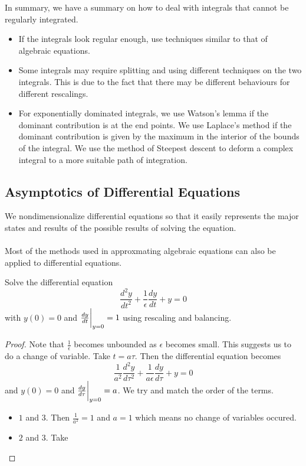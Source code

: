 \documentclass[a4paper]{article}
\begin{document}
In summary, we have a summary on how to deal with integrals that cannot be regularly integrated. 
\begin{itemize}
\item If the integrals look regular enough, use techniques similar to that of algebraic equations. 
\item Some integrals may require splitting and using different techniques on the two integrals. This is due to the fact that there may be different behaviours for different rescalings. 
\item For exponentially dominated integrals, we use Watson's lemma if the dominant contribution is at the end points. We use Laplace's method if the dominant contribution is given by the maximum in the interior of the bounds of the integral. We use the method of Steepest descent to deform a complex integral to a more suitable path of integration. 
\end{itemize}

\subsection{Asymptotics of Differential Equations}
We nondimensionalize differential equations so that it easily represents the major states and results of the possible results of solving the equation. \\~\\
Most of the methods used in approxmating algebraic equations can also be applied to differential equations. 

\begin{eg}{}{} Solve the differential equation $$\frac{d^2y}{dt^2}+\frac{1}{\epsilon}\frac{dy}{dt}+y=0$$ with $y(0)=0$ and $\frac{dy}{dt}\bigg{|}_{y=0}=1$ using rescaling and balancing. \tcbline
\begin{proof}
Note that $\frac{1}{\epsilon}$ becomes unbounded as $\epsilon$ becomes small. This suggests us to do a change of variable. Take $t=a\tau$. Then the differential equation becomes $$\frac{1}{a^2}\frac{d^2y}{d\tau^2}+\frac{1}{a\epsilon}\frac{dy}{d\tau}+y=0$$ and $y(0)=0$ and $\frac{dy}{d\tau}\bigg{|}_{y=0}=a$. We try and match the order of the terms. 
\begin{itemize}
\item $1$ and $3$. Then $\frac{1}{a^2}=1$ and $a=1$ which means no change of variables occured. 
\item $2$ and $3$. Take 
\end{itemize}
\end{proof}
\end{eg}
\end{document}
